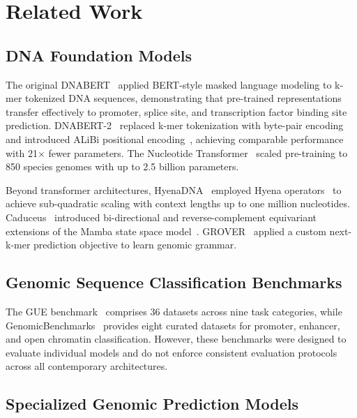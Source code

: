 \documentclass{article}
\begin{document}
\section{Related Work}
\label{sec:related}

\subsection{DNA Foundation Models}

The original DNABERT~\citep{ji_2021_dnabert} applied BERT-style masked language
modeling to k-mer tokenized DNA sequences, demonstrating that pre-trained
representations transfer effectively to promoter, splice site, and transcription
factor binding site prediction. DNABERT-2~\citep{zhou_2024_dnabert2} replaced
k-mer tokenization with byte-pair encoding~\citep{sennrich_2016_bpe} and
introduced ALiBi positional encoding~\citep{press_2022_alibi}, achieving
comparable performance with 21$\times$ fewer parameters. The Nucleotide
Transformer~\citep{dallatorre_2024_nucleotide} scaled pre-training to 850
species genomes with up to 2.5 billion parameters.

Beyond transformer architectures, HyenaDNA~\citep{nguyen_2023_hyenadna} employed
Hyena operators~\citep{poli_2023_hyena} to achieve sub-quadratic scaling with
context lengths up to one million nucleotides. Caduceus~\citep{schiff_2024_caduceus}
introduced bi-directional and reverse-complement equivariant extensions of the
Mamba state space model~\citep{gu_2024_mamba}. GROVER~\citep{sanabria_2024_grover}
applied a custom next-k-mer prediction objective to learn genomic grammar.

\subsection{Genomic Sequence Classification Benchmarks}

The GUE benchmark~\citep{zhou_2024_dnabert2} comprises 36 datasets across nine
task categories, while GenomicBenchmarks~\citep{gresova_2023_genomicbenchmarks}
provides eight curated datasets for promoter, enhancer, and open chromatin
classification. However, these benchmarks were designed to evaluate individual
models and do not enforce consistent evaluation protocols across all contemporary
architectures.

\subsection{Specialized Genomic Prediction Models}
\end{document}
